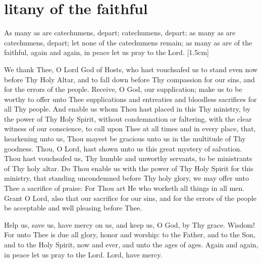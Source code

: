 \section{litany of the faithful}

\begin{liturgicaltext}
    \deacon As many as are catechumens, depart; catechumens, depart; as many as are catechumens, depart; let none of the catechumens remain; as many as are of the faithful, again and again, in peace let us pray to the Lord.
    \choirsemisecret {}[1.5cm]
\end{liturgicaltext}
\begin{semisecret}
    \begin{secretprayerbasil}
        We thank Thee, O Lord God of Hosts, who hast vouchsafed us to stand even now before Thy Holy Altar, and to fall down before Thy compassion for our sins, and for the errors of the people. Receive, O God, our supplication; make us to be worthy to offer unto Thee supplications and entreaties and bloodless sacrifices for all Thy people. And enable us whom Thou hast placed in this Thy ministry, by the power of Thy Holy Spirit, without condemnation or faltering, with the clear witness of our conscience, to call upon Thee at all times and in every place, that, hearkening unto us, Thou mayest be gracious unto us in the multitude of Thy goodness.
        \switchcolumn
        Thou, O Lord, hast shown unto us this great mystery of salvation. Thou hast vouchsafed us, Thy humble and unworthy servants, to be ministrants of Thy holy altar. Do Thou enable us with the power of Thy Holy Spirit for this ministry, that standing uncondemned before Thy holy glory, we may offer unto Thee a sacrifice of praise: For Thou art He who worketh all things in all men. Grant O Lord, also that our sacrifice for our sins, and for the errors of the people be acceptable and well pleasing before Thee.
    \end{secretprayerbasil}
\end{semisecret}
\begin{liturgicaltext}
    \deacon Help us, save us, have mercy on us, and keep us, O God, by Thy grace.
    \choir {}
    \deacon Wisdom!
    \priest For unto Thee is due all glory, honor and worship: to the Father, and to the Son, and to the Holy Spirit, now and ever, and unto the ages of ages.
    \choir {}
    \deacon Again and again, in peace let us pray to the Lord.
    \choirsemisecret Lord, have mercy. 
\end{liturgicaltext}
